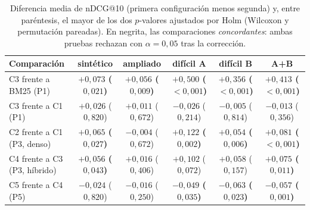 \begin{table}[htbp]
\centering
\footnotesize
\setlength{\tabcolsep}{5pt}
\renewcommand{\arraystretch}{1.25}
\caption{Diferencia media de nDCG@10 (primera configuración menos segunda) y, entre paréntesis, el mayor de los dos $p$-valores ajustados por Holm (Wilcoxon y permutación pareadas). En negrita, las comparaciones \emph{concordantes}: ambas pruebas rechazan con $\alpha=0{,}05$ tras la corrección.}
\label{tab:estadistica}
\begin{tabularx}{\textwidth}{@{}l C C C C C@{}}
\toprule
\textbf{Comparación} & \textbf{sintético} & \textbf{ampliado} & \textbf{difícil A} & \textbf{difícil B} & \textbf{A+B} \\
\midrule
C3 frente a BM25 (P1) & {\boldmath\bfseries $+0{,}073$ ($0{,}021$)} & {\boldmath\bfseries $+0{,}056$ ($0{,}009$)} & {\boldmath\bfseries $+0{,}500$ ($<\!0{,}001$)} & {\boldmath\bfseries $+0{,}356$ ($<\!0{,}001$)} & {\boldmath\bfseries $+0{,}413$ ($<\!0{,}001$)} \\
C3 frente a C1 (P1) & $+0{,}026$ ($0{,}820$) & $+0{,}011$ ($0{,}672$) & $-0{,}026$ ($0{,}214$) & $-0{,}005$ ($0{,}814$) & $-0{,}013$ ($0{,}356$) \\
C2 frente a C1 (P3, denso) & {\boldmath\bfseries $+0{,}065$ ($0{,}027$)} & $-0{,}004$ ($0{,}672$) & {\boldmath\bfseries $+0{,}122$ ($0{,}002$)} & {\boldmath\bfseries $+0{,}054$ ($0{,}006$)} & {\boldmath\bfseries $+0{,}081$ ($<\!0{,}001$)} \\
C4 frente a C3 (P3, híbrido) & {\boldmath\bfseries $+0{,}056$ ($0{,}043$)} & $+0{,}016$ ($0{,}406$) & $+0{,}102$ ($0{,}072$) & $+0{,}058$ ($0{,}157$) & {\boldmath\bfseries $+0{,}075$ ($0{,}011$)} \\
C5 frente a C4 (P5) & $-0{,}024$ ($0{,}820$) & $-0{,}016$ ($0{,}250$) & {\boldmath\bfseries $-0{,}049$ ($0{,}035$)} & {\boldmath\bfseries $-0{,}063$ ($0{,}023$)} & {\boldmath\bfseries $-0{,}057$ ($0{,}001$)} \\
\bottomrule
\end{tabularx}
\end{table}

